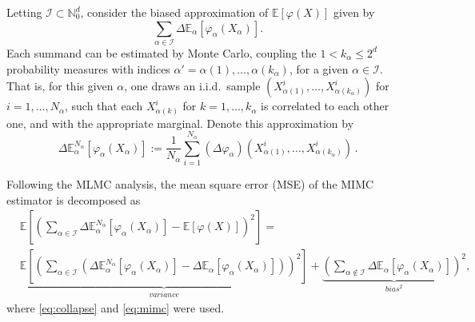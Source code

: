 \documentclass[english]{article}
\newcommand{\bbE}{\mathbb{E}}
\begin{document}
Letting $\mathcal{I} \subset \mathbb{N}_0^d$, 
\cite{mimc} consider the biased approximation of $\mathbb{E}[\varphi(X)]$ 
given by 
\begin{equation}\label{eq:mimc}
\sum_{\alpha\in\mathcal{I}}\Delta \mathbb{E}_{\alpha}[\varphi_{\alpha}(X_{\alpha})].
\end{equation}
Each summand can be estimated by Monte Carlo, 
coupling the $1<k_\alpha \leq 2^d$ probability measures with indices 
$\alpha' = \alpha(1),\dots, \alpha(k_\alpha)$,
for a given $\alpha\in\mathcal{I}$.  
That is, for this given $\alpha$, %
one draws an i.i.d.~sample $(X_{\alpha(1)}^i,\dots,X_{\alpha(k_\alpha)}^i)$ 
for $i=1,\dots, N_\alpha$, such that each $X_{\alpha(k)}^i$
for $k=1,\dots, k_\alpha$ is correlated to each other one, and with the appropriate marginal.
Denote this approximation by 
$$
\Delta \mathbb{E}^{N_\alpha}_{\alpha}[\varphi_{\alpha}(X_{\alpha})] := 
\frac{1}{N_\alpha} \sum_{i=1}^{N_\alpha} (\Delta \varphi_\alpha)(X^i_{\alpha(1)},\dots, X^i_{\alpha(k_\alpha)}) \, .
$$

Following the MLMC analysis, the mean square error (MSE) 
of the MIMC estimator is decomposed as
\begin{equation}%
\begin{split}
& \bbE\left [ \left (\sum_{\alpha\in\mathcal{I}} \Delta \mathbb{E}^{N_\alpha}_{\alpha}[\varphi_{\alpha}(X_{\alpha})] 
- \mathbb{E}[\varphi(X)] \right )^2 \right ] = \\
& \underbrace{\bbE\left [ \left (\sum_{\alpha\in\mathcal{I}} 
( \Delta \mathbb{E}^{N_\alpha}_{\alpha}[\varphi_{\alpha}(X_{\alpha})] 
- \Delta \mathbb{E}_{\alpha}[\varphi_{\alpha}(X_{\alpha})] ) \right )^2 \right ] }_{variance}
+ \underbrace{\left (  \sum_{\alpha\notin\mathcal{I}} 
\Delta \mathbb{E}_{\alpha}[\varphi_{\alpha}(X_{\alpha})] \right )^2}_{bias^2},
\end{split}\label{eq:mimse}
\end{equation}
where \eqref{eq:collapse} and \eqref{eq:mimc} were used.
\end{document}
